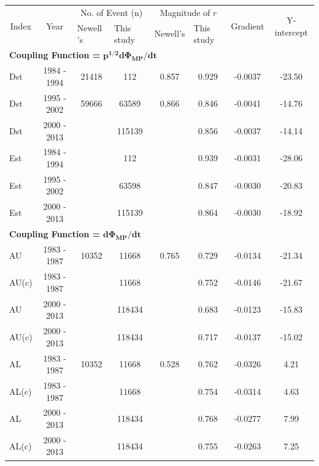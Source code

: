 \documentclass[12pt]{report} %
\begin{document}
\begin{table}\small
\centering
\renewcommand{\arraystretch}{1.2}

\begin{tabular}{lccccccc}
\hline\hline
\multicolumn{1}{c}{\multirow{2}{*}{Index}} &
\multicolumn{1}{c}{\multirow{2}{*}{Year}} & 
\multicolumn{2}{c}{No. of Event (n)}& 
\multicolumn{2}{c}{Magnitude of $r$ }&
\multicolumn{1}{c}{\multirow{2}{*}{Gradient}} & 
\multicolumn{1}{c}{\multirow{2}{*}{Y-intercept}} \\ \cline{3-6} 

\multicolumn{1}{l}{}& \multicolumn{1}{l}{} & \multicolumn{1}{l}{Newell 's} & \multicolumn{1}{l}{This study} & \multicolumn{1}{l}{Newell's} & \multicolumn{1}{l}{This study} &&  \\ \hline

\multicolumn{8}{l}{{\bfseries Coupling Function =} $\mathbf{p^{1/2}d\Phi_{MP}/dt}$}  \\

Dst  & 1984 - 1994 & 21418& 112  &0.857& 0.929 &-0.0037&-23.50\\         
Dst & 1995 - 2002 & 59666 & 63589& 0.866 &0.846 &-0.0041&-14.76\\
Dst & 2000 - 2013 &  & 115139&  & 0.856  & -0.0037&-14.14\\ \hline
Est & 1984 - 1994& & 112&& 0.939 &-0.0031&-28.06 \\
Est & 1995 - 2002& & 63598& & 0.847 & -0.0030&-20.83\\
Est & 2000 - 2013&& 115139& & 0.864  & -0.0030& -18.92\\ \hline

\multicolumn{8}{l}{{\bfseries Coupling Function =} $\mathbf{d\Phi_{MP}/dt}$}  \\

AU & 1983 - 1987& 10352 & 11668& 0.765 & 0.729 & -0.0134&-21.34\\
AU(c) & 1983 - 1987&  & 11668& & 0.752 & -0.0146&-21.67\\
AU & 2000 - 2013&  & 118434& & 0.683 &-0.0123&-15.83\\
AU(c)  & 2000 - 2013&  & 118434&  &0.717 &-0.0137&-15.02\\
AL & 1983 - 1987& 10352 & 11668&0.528 & 0.762 &-0.0326&4.21\\
AL(c) & 1983 - 1987&  & 11668&  & 0.754 &-0.0314&4.63\\
AL & 2000 - 2013&  & 118434&& 0.768 &-0.0277&7.99\\
AL(c)  & 2000 - 2013&  & 118434& & 0.755 &-0.0263&7.25\\ \hline


\end{tabular}
\end{table}
\end{document}
